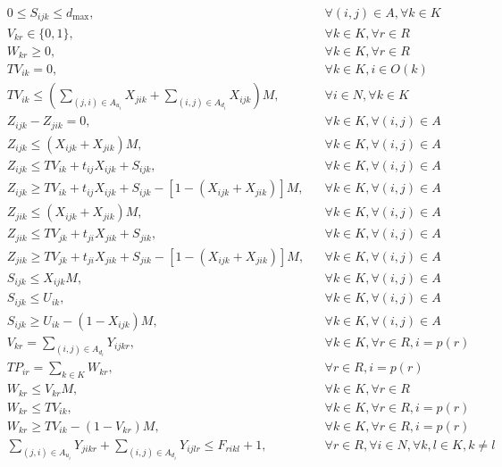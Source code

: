 \documentclass[10pt]{article}
\begin{document}
\[\begin{aligned}
& 0 \leq S_{ijk} \leq d_{\max}, && \forall (i, j) \in A, \forall k \in K \\
& V_{kr} \in \{0, 1\}, && \forall k \in K, \forall r \in R \\
& W_{kr} \geq 0, && \forall k \in K, \forall r \in R \\
& TV_{ik} = 0, && \forall k \in K, i \in O(k) \\
& TV_{ik} \leq \left( \sum_{(j,i) \in A_{u_i}} X_{jik} + \sum_{(i,j) \in A_{d_i}} X_{ijk} \right) M, && \forall i \in N, \forall k \in K \\
& Z_{ijk} - Z_{jik} = 0, && \forall k \in K, \forall (i, j) \in A \\
& Z_{ijk} \leq (X_{ijk} + X_{jik}) M, && \forall k \in K, \forall (i, j) \in A \\
& Z_{ijk} \leq TV_{ik} + t_{ij}X_{ijk} + S_{ijk}, && \forall k \in K, \forall (i, j) \in A \\
& Z_{ijk} \geq TV_{ik} + t_{ij}X_{ijk} + S_{ijk} - \left[ 1 - (X_{ijk} + X_{jik}) \right] M, && \forall k \in K, \forall (i, j) \in A \\
& Z_{jik} \leq (X_{ijk} + X_{jik}) M, && \forall k \in K, \forall (i, j) \in A \\
& Z_{jik} \leq TV_{jk} + t_{ji}X_{jik} + S_{jik}, && \forall k \in K, \forall (i, j) \in A \\
& Z_{jik} \geq TV_{jk} + t_{ji}X_{jik} + S_{jik} - \left[ 1 - (X_{ijk} + X_{jik}) \right] M, && \forall k \in K, \forall (i, j) \in A \\
& S_{ijk} \leq X_{ijk} M, && \forall k \in K, \forall (i, j) \in A \\
& S_{ijk} \leq U_{ik}, && \forall k \in K, \forall (i, j) \in A \\
& S_{ijk} \geq U_{ik} - (1 - X_{ijk}) M, && \forall k \in K, \forall (i, j) \in A \\
& V_{kr} = \sum_{(i,j) \in A_{d_i}} Y_{ijkr}, && \forall k \in K, \forall r \in R, i = p(r) \\
& TP_{ir} = \sum_{k \in K} W_{kr}, && \forall r \in R, i = p(r) \\
& W_{kr} \leq V_{kr} M, && \forall k \in K, \forall r \in R \\
& W_{kr} \leq TV_{ik}, && \forall k \in K, \forall r \in R, i = p(r) \\
& W_{kr} \geq TV_{ik} - (1 - V_{kr}) M, && \forall k \in K, \forall r \in R, i = p(r) \\
& \sum_{(j,i) \in A_{u_i}} Y_{jikr} + \sum_{(i,j) \in A_{d_i}} Y_{ijlr} \leq F_{rikl} + 1, && \forall r \in R, \forall i \in N, \forall k, l \in K, k \neq l \\

\end{aligned}\]
\end{document}
